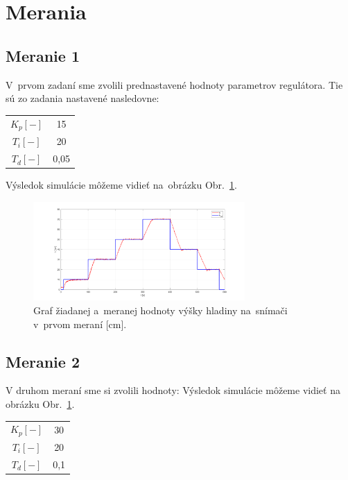 \documentclass{article}
\begin{document}
\newpage

\section{Merania}
\label{sec:merania}

\subsection{Meranie 1}
\label{sec:meranie1}

V~prvom zadaní sme zvolili prednastavené hodnoty parametrov regulátora. Tie sú zo zadania nastavené nasledovne:

\begin{center}
\begin{tabular}{ |c|c| }
 \hline
 $K_p [-]$ & 15 \\
 $T_i [-]$ & 20 \\
 $T_d [-]$ & 0,05 \\
 \hline
\end{tabular}
\end{center}

Výsledok simulácie môžeme vidieť na~obrázku Obr.~\ref{fig:m1}.

\begin{figure}[!htbp]
	\begin{center}
		\includegraphics[width=0.719\textwidth]{./include/meranie1.png}
	\end{center}
	\caption{Graf žiadanej a~meranej hodnoty výšky hladiny na~snímači v~prvom meraní [cm].}
	\label{fig:m1}
\end{figure}


\clearpage

\subsection{Meranie 2}
\label{sec:meranie2}

V druhom meraní sme si zvolili hodnoty:
Výsledok simulácie môžeme vidieť na obrázku Obr.~\ref{fig:m1}.
\begin{center}
\begin{tabular}{ |c|c| }
 \hline
 $K_p [-]$ & 30 \\
 $T_i [-]$ & 20 \\
 $T_d [-]$ & 0,1 \\
 \hline
\end{tabular}
\end{center}
\end{document}
